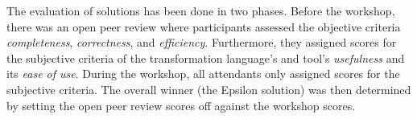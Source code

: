 \documentclass[submission]{eptcs}
\begin{document}
The evaluation of solutions has been done in two phases.  Before the workshop,
there was an open peer review where participants assessed the objective
criteria \emph{completeness}, \emph{correctness}, and \emph{efficiency}.
Furthermore, they assigned scores for the subjective criteria of the
transformation language's and tool's \emph{usefulness} and its \emph{ease of
  use}.  During the workshop, all attendants only assigned scores for the
subjective criteria.  The overall winner (the Epsilon solution) was then
determined by setting the open peer review scores off against the workshop
scores.



\end{document}
